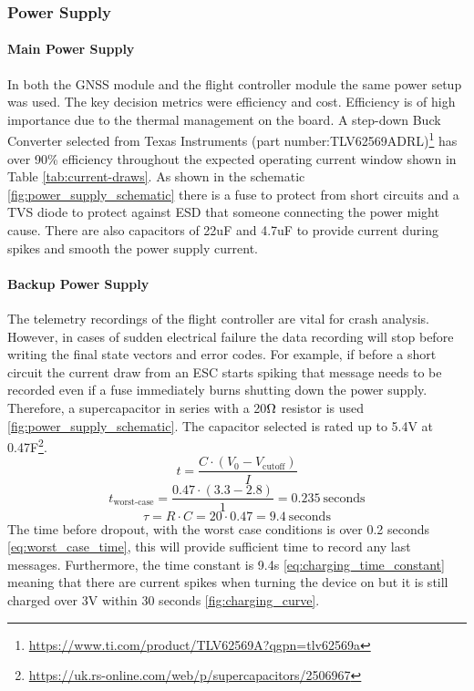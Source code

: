 \subsubsection{Power Supply}\label{sub_sub_section:tgt_power_supply}

\paragraph{Main Power Supply}
In both the GNSS module and the flight controller module the same power setup was used. The key decision metrics were efficiency and cost.  Efficiency is of high importance due to the thermal management on the board. A step-down Buck Converter selected from Texas Instruments (part number:TLV62569ADRL)\footnote{\url{https://www.ti.com/product/TLV62569A?qgpn=tlv62569a}} has over 90\% efficiency throughout the expected operating current window shown in Table \ref{tab:current-draws}. As shown in the schematic \ref{fig:power_supply_schematic} there is a fuse to protect from short circuits and a \gls{TVS} diode to protect against \gls{ESD} that someone connecting the power might cause. There are also capacitors of 22uF and 4.7uF to provide current during spikes and smooth the power supply current.

\paragraph{Backup Power Supply}
The telemetry recordings of the flight controller are vital for crash analysis. However, in cases of sudden electrical failure the data recording will stop before writing the final state vectors and error codes. For example, if before a short circuit the current draw from an \gls{ESC} starts spiking that message needs to be recorded even if a fuse immediately burns shutting down the power supply. Therefore, a supercapacitor in series with a 20$\ohm$ resistor is used \ref{fig:power_supply_schematic}. The capacitor selected is rated up to 5.4V at 0.47F\footnote{\url{https://uk.rs-online.com/web/p/supercapacitors/2506967}}. 
\begin{equation}
t = \frac{C \cdot (V_0 - V_{\text{cutoff}})}{I}
\label{eq:discharge_time}
\end{equation}
\begin{equation}
t_{\text{worst-case}} = \frac{0.47 \cdot (3.3 - 2.8)}{1} = 0.235\ \text{seconds}
\label{eq:worst_case_time}
\end{equation}
\begin{equation}
\tau = R \cdot C = 20 \cdot 0.47 = 9.4\ \text{seconds}
\label{eq:charging_time_constant}
\end{equation}
The time before dropout, with the worst case conditions is over 0.2 seconds \ref{eq:worst_case_time}, this will provide sufficient time to record any last messages. Furthermore, the time constant is 9.4s \ref{eq:charging_time_constant} meaning that there are current spikes when turning the device on but it is still charged over 3V within 30 seconds \ref{fig:charging_curve}.


